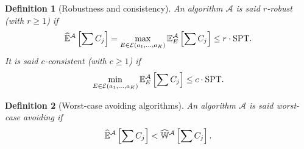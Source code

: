 \documentclass{article}
\newtheorem{definition}{Definition}
\begin{document}

\begin{definition}[Robustness and consistency]
    An algorithm \(\mathcal{A}\) is said \(r\)-robust (with \(r\ge 1\)) if
    \[
        \widehat{\mathbb{E}}^{\mathcal{A}}\left[\sum C_j\right]=\max_{E\in\mathcal{E}(a_1,\ldots,a_K)} \mathbb{E}^{\mathcal{A}}_E\left[\sum C_j\right] \le r\cdot \text{SPT}.
    \]
    It is said \(c\)-consistent (with \(c\ge 1\)) if
    \[
        \min_{E\in\mathcal{E}(a_1,\ldots,a_K)} \mathbb{E}^{\mathcal{A}}_E\left[\sum C_j\right] \le c\cdot \text{SPT}.
    \]
\end{definition}

\begin{definition}[Worst-case avoiding algorithms]
    An algorithm \(\mathcal{A}\) is said \emph{worst-case avoiding} if
    \[
        \widehat{\mathbb{E}}^{\mathcal{A}}\left[\sum C_j\right] < \widehat{\mathbb{W}}^{\mathcal{A}}\left[\sum C_j\right].
    \]
\end{definition}

\end{document}
